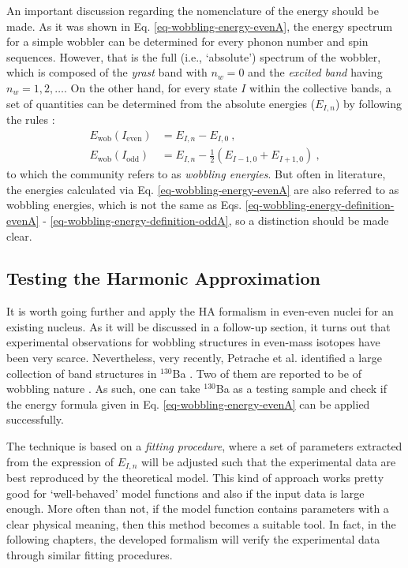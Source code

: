 An important discussion regarding the nomenclature of the energy should be made. As it was shown in Eq. \ref{eq-wobbling-energy-evenA}, the energy spectrum for a simple wobbler can be determined for every phonon number and spin sequences. However, that is the full (i.e., `absolute') spectrum  of the wobbler, which is composed of the \emph{yrast} band with $n_w=0$ and the \emph{excited band} having $n_w=1,2,\dots$. On the other hand, for every state $I$ within the collective bands, a set of quantities can be determined from the absolute energies ($E_{I,n}$) by following the rules \cite{wen2015wobbling}:
\begin{align}
    E_\text{wob}(I_\text{even})&=E_{I,n}-E_{I,0}\ , \label{eq-wobbling-energy-definition-evenA} \\
    E_\text{wob}(I_\text{odd})&=E_{I,n}-\frac{1}{2}\left(E_{I-1,0}+E_{I+1,0}\right)\ ,
    \label{eq-wobbling-energy-definition-oddA}
\end{align}
to which the community refers to as \emph{wobbling energies}. But often in literature, the energies calculated via Eq. \ref{eq-wobbling-energy-evenA} are also referred to as wobbling energies, which is not the same as Eqs. \ref{eq-wobbling-energy-definition-evenA} - \ref{eq-wobbling-energy-definition-oddA}, so a distinction should be made clear.

\subsection{Testing the Harmonic Approximation}
\label{ba-130-numerical-calculations}

It is worth going further and apply the HA formalism in even-even nuclei for an existing nucleus. As it will be discussed in a follow-up section, it turns out that experimental observations for wobbling structures in even-mass isotopes have been very scarce. Nevertheless, very recently, Petrache et al. identified a large collection of band structures in $^{130}$Ba \cite{petrache2019diversity}. Two of them are reported to be of wobbling nature \cite{chen2019transverse}. As such, one can take $^{130}$Ba as a testing sample and check if the energy formula given in Eq. \ref{eq-wobbling-energy-evenA} can be applied successfully.

The technique is based on a \emph{fitting procedure}, where a set of parameters extracted from the expression of $E_{I,n}$ will be adjusted such that the experimental data are best reproduced by the theoretical model. This kind of approach works pretty good for `well-behaved' model functions and also if the input data is large enough. More often than not, if the model function contains parameters with a clear physical meaning, then this method becomes a suitable tool. In fact, in the following chapters, the developed formalism will verify the experimental data through similar fitting procedures.

